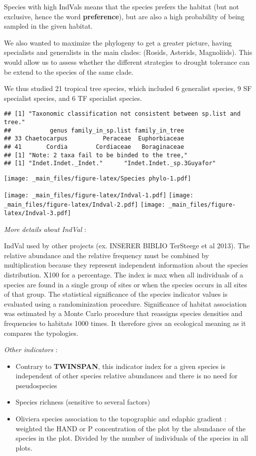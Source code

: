\documentclass[
]{book}
\providecommand{\tightlist}{%
  \setlength{\itemsep}{0pt}\setlength{\parskip}{0pt}}
\begin{document}
Species with high IndVals means that the species prefers the habitat (but not exclusive, hence the word \textbf{preference}), but are also a high probability of being sampled in the given habitat.

We also wanted to maximize the phylogeny to get a greater picture, having specialists and generalists in the main clades: (Rosids, Asterids, Magnoliids). This would allow us to assess whether the different strategies to drought tolerance can be extend to the species of the same clade.

We thus studied 21 tropical tree species, which included 6 generalist species, 9 SF specialist species, and 6 TF specialist species.

\begin{verbatim}
## [1] "Taxonomic classification not consistent between sp.list and tree."
##           genus family_in_sp.list family_in_tree
## 33 Chaetocarpus          Peraceae  Euphorbiaceae
## 41       Cordia        Cordiaceae   Boraginaceae
## [1] "Note: 2 taxa fail to be binded to the tree,"
## [1] "Indet.Indet._Indet."      "Indet.Indet._sp.3Guyafor"
\end{verbatim}

\texttt{[image: \_main\_files/figure-latex/Species phylo-1.pdf]}

\texttt{[image: \_main\_files/figure-latex/Indval-1.pdf]} \texttt{[image: \_main\_files/figure-latex/Indval-2.pdf]} \texttt{[image: \_main\_files/figure-latex/Indval-3.pdf]}

\emph{More details about IndVal} :

IndVal used by other projects (ex. INSERER BIBLIO TerSteege et al 2013). The relative abundance and the relative frequency must be combined by multiplication because they represent independent information about the species distribution. X100 for a percentage. The index is max when all individuals of a species are found in a single group of sites or when the species occurs in all sites of that group. The statistical significance of the species indicator values is evaluated using a randominization procedure. Significance of habitat association was estimated by a Monte Carlo procedure that reassigns species densities and frequencies to habitats 1000 times. It therefore gives an ecological meaning as it compares the typologies.

\emph{Other indicators} :

\begin{itemize}
\tightlist
\item
  Contrary to \textbf{TWINSPAN}, this indicator index for a given species is independent of other species relative abundances and there is no need for pseudospecies
\item
  Species richness (sensitive to several factors)
\item
  Oliviera species association to the topographic and edaphic gradient : weighted the HAND or P concentration of the plot by the abundance of the species in the plot. Divided by the number of individuals of the species in all plots.
\end{itemize}
\end{document}
